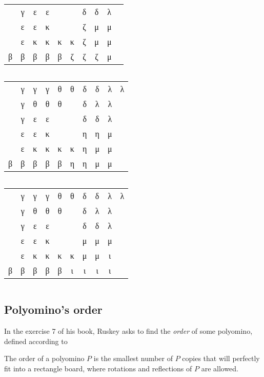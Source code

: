 \begin{margintable}
{\begin{tabular}{|cccccccccc|}
  & γ & ε & ε &   &   & δ & δ & λ & \\
  & ε & ε & κ &   &   & ζ & μ & μ & \\
  & ε & κ & κ & κ & κ & ζ & μ & μ & \\
β & β & β & β & β & ζ & ζ & ζ & μ & \\
\hline
\end{tabular}
$\quad$\\
$\quad$\\
\begin{tabular}{|cccccccccc|}
\hline
  & γ & γ & γ & θ & θ & δ & δ & λ & λ \\
  & γ & θ & θ & θ &   & δ & λ & λ & \\
  & γ & ε & ε &   &   & δ & δ & λ & \\
  & ε & ε & κ &   &   & η & η & μ & \\
  & ε & κ & κ & κ & κ & η & μ & μ & \\
β & β & β & β & β & η & η & μ & μ & \\
\hline
\end{tabular}
$\quad$\\
$\quad$\\
\begin{tabular}{|cccccccccc|}
\hline
  & γ & γ & γ & θ & θ & δ & δ & λ & λ \\
  & γ & θ & θ & θ &   & δ & λ & λ & \\
  & γ & ε & ε &   &   & δ & δ & λ & \\
  & ε & ε & κ &   &   & μ & μ & μ & \\
  & ε & κ & κ & κ & κ & μ & μ & ι & \\
β & β & β & β & β & ι & ι & ι & ι & \\
\hline
\end{tabular}
$\quad$\\
$\quad$\\
}
\end{margintable}

\subsection{Polyomino's order}

In the exercise 7 of his book, Ruskey asks to find the \textit{order} of some
polyomino, defined according to

\begin{definition}
The order of a polyomino $P$ is the smallest number of $P$ copies that will
perfectly fit into a rectangle board, where rotations and reflections of $P$
are allowed.
\end{definition}

